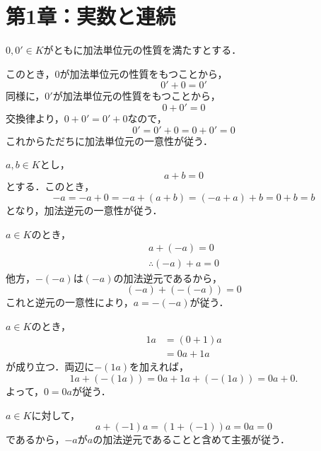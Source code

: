 
\part*{第1章：実数と連続}



\begin{tproof}
    $0,0' \in K$がともに加法単位元の性質を満たすとする．

    このとき，$0$が加法単位元の性質をもつことから，
    \[
        0'+0=0'
    \]
    同様に，$0'$が加法単位元の性質をもつことから，
    \[
        0+0' = 0
    \]
    交換律より，$0+0'=0'+0$なので，
    \[
        0'=0'+0 =0+0' =0
    \]
    これからただちに加法単位元の一意性が従う．
\end{tproof}

\begin{tproof}
    $a ,b \in K$とし，
    \[
        a+b =0
    \]
    とする．このとき，
    \[
        -a = -a+0 = -a +(a+b)=(-a+a)+b =0+b = b
    \]
    となり，加法逆元の一意性が従う．
\end{tproof}

\begin{tproof}
    $a \in K$のとき，
    \begin{gather*}
        a+(-a)=0 \\
        \therefore (-a)+a =0
    \end{gather*}
    他方，$-(-a)$は$(-a)$の加法逆元であるから，
    \[
        (-a)+(-(-a))=0
    \]
    これと逆元の一意性により，$a=-(-a)$が従う．
\end{tproof}

\begin{tproof}
    $a \in K$のとき，
    \begin{align*}
        1a & = (0 + 1)a \\
           & = 0a + 1a
    \end{align*}
    が成り立つ．両辺に$-(1a)$を加えれば，
    \[
        1a + (-(1a)) = 0a + 1a + (-(1a)) = 0a + 0.
    \]
    よって，$0 = 0a$が従う．
\end{tproof}

\begin{tproof}
    $a \in K$に対して，
    \[
        a+(-1)a=(1+(-1))a =0a =0
    \]
    であるから，$-a$が$a$の加法逆元であることと含めて主張が従う．
\end{tproof}



